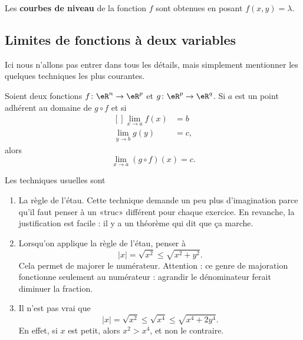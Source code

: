 Les \textbf{courbes de niveau} de la fonction \( f\) sont obtenues en posant \( f(x,y)=\lambda\).

\subsection{Limites de fonctions à deux variables}

Ici nous n'allons pas entrer dans tous les détails, mais simplement mentionner les quelques techniques les plus courantes.

\begin{theorem}		\label{ThoLimiteCompose}
	Soient deux fonctions \( f\colon \eR^n\to \eR^p\) et \( g\colon \eR^p\to \eR^q\). Si \( a\) est un point adhérent au domaine de \( g\circ f\) et si
	\begin{equation}
		\begin{aligned}[]
			\lim_{x\to a}f(x) & =b  \\
			\lim_{y\to b}g(y) & =c,
		\end{aligned}
	\end{equation}
	alors
	\begin{equation}
		\lim_{x\to a}(g\circ f)(x)=c.
	\end{equation}
\end{theorem}

Les techniques usuelles sont
\begin{enumerate}

	\item
	      La règle de l'étau. Cette technique demande un peu plus d'imagination parce qu'il faut penser à un «truc» différent pour chaque exercice. En revanche, la justification est facile : il y a un théorème qui dit que ça marche.

	\item
	      Lorsqu'on applique la règle de l'étau, penser à
	      \begin{equation}
		      | x |=\sqrt{x^2}\leq\sqrt{x^2+y^2}.
	      \end{equation}
	      Cela permet de majorer le numérateur. Attention : ce genre de majoration fonctionne seulement au numérateur : agrandir le dénominateur ferait diminuer la fraction.

	\item
	      Il n'est pas vrai que
	      \begin{equation}
		      | x |=\sqrt{x^2}\leq\sqrt{x^4}\leq\sqrt{x^4+2y^4}.
	      \end{equation}
	      En effet, si \( x\) est petit, alors \( x^2>x^4\), et non le contraire.

\end{enumerate}

